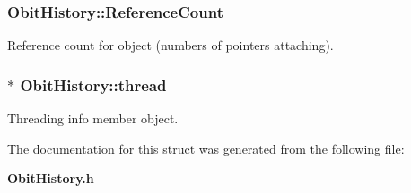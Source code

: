 \subsubsection{ {\bf Obit\-History::Reference\-Count}}\label{structObitHistory_o2}


Reference count for object (numbers of pointers attaching). 

\subsubsection{$\ast$ {\bf Obit\-History::thread}}\label{structObitHistory_o4}


Threading info member object. 



The documentation for this struct was generated from the following file:\begin{CompactItemize}
\item 
{\bf Obit\-History.h}\end{CompactItemize}
